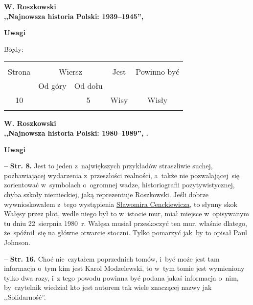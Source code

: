 \documentclass[a4paper,11pt]{article}
\newcommand{\spaceOne}{2em}
\newcommand{\tb}{\textbf}
\newcommand{\noi}{\noindent}
\newcommand{\start}{\noi \tb{--} {}}
\newcommand{\Center}[1]{\begin{center} #1 \end{center}}
\newcommand{\CenterTB}[1]{\Center{\tb{#1}}}
\newcommand{\Str}[1]{\tb{Str. #1.}}
\newcommand{\Work}[1]{ \begin{center} {\large \tb{#1}} \end{center} }
\begin{document}
\vspace{\spaceOne}



\Work{
  W. Roszkowski \\
  ,,Najnowsza historia Polski: 1939--1945'', \cite{Ros11b} }


\CenterTB{Uwagi}

Błędy:\\
\begin{center}
  \begin{tabular}{|c|c|c|c|c|}
    \hline
    & \multicolumn{2}{c|}{} & & \\
    Strona & \multicolumn{2}{c|}{Wiersz}& Jest & Powinno być \\ \cline{2-3}
    & Od góry & Od dołu &  &  \\ \hline
    10 & & 5 & Wisy & Wisły \\
    & & & & \\ \hline
  \end{tabular}
\end{center}

\vspace{\spaceOne}



\Work{
  W. Roszkowski \\
  ,,Najnowsza historia Polski: 1980--1989'', \cite{Ros11f}. }


\CenterTB{Uwagi}

\start \Str{8} Jest to jeden z~największych przykładów straszliwie
suchej, pozbawiającej wydarzenia z~przeszłości realności, a~także nie
pozwalającej~się zorientować w~symbolach o~ogromnej wadze,
historiografii pozytywistycznej, chyba szkoły niemieckiej, jaką
reprezentuje Roszkowski. Jeśli dobrze wywnioskowałem z~tego
wystąpienia
\href{https://www.youtube.com/watch?v=6B93_3CCMac}{Sławomira
  Cenckiewicza}, to słynny skok Wałęsy przez płot, wedle niego był to
w~istocie mur, miał miejsce w~opisywanym tu dniu 22~sierpnia 1980~r.
Wałęsa musiał przeskoczyć ten mur, właśnie dlatego, że~spóźnił~się na
główne otwarcie stoczni. Tylko pomarzyć jak~by to opisał Paul Johnson.

\start \Str{16} Choć nie~czytałem poprzednich tomów, i~być może jest
tam informacja o~tym kim jest Karol Modzelewski, to w~tym tomie jest
wymieniony tylko dwa razy, i~z tego powodu powinna być podana jakaś
informacja o~nim, by~czytelnik wiedział kto jest autorem tak wiele
znaczącej nazwy jak ,,Solidarność''.
\end{document}
